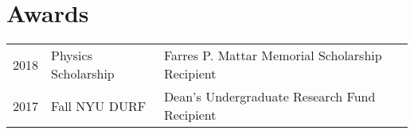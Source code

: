 

\section{Awards} 
\begin{tabular}{rll}
2018         & Physics Scholarship & Farres P. Mattar Memorial Scholarship Recipient\\
2017	     & Fall NYU DURF  & Dean's Undergraduate Research Fund Recipient\\
\end{tabular}
\sectionsep
